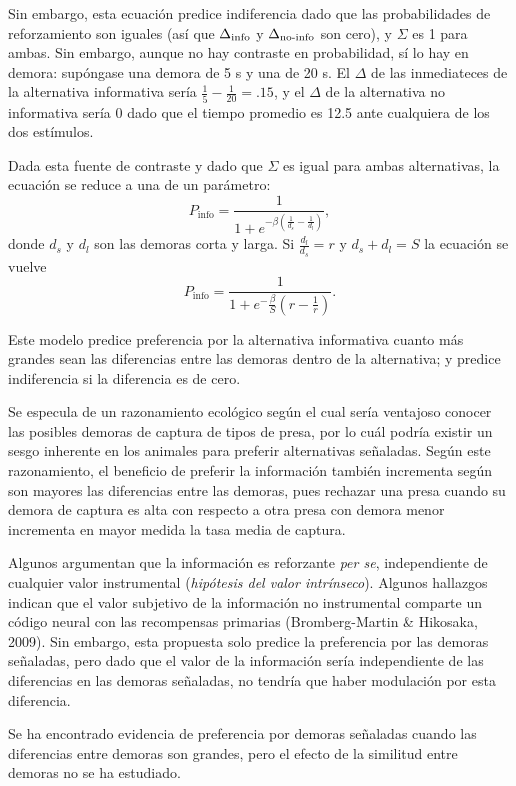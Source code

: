 \documentclass[a4paper,12pt]{article}
\begin{document}
Sin embargo, esta ecuación predice indiferencia dado que las probabilidades de reforzamiento son iguales (así que $\Delta_{\mbox{\scriptsize info}}$ y $\Delta_{\mbox{\scriptsize no-info}}$ son cero), y $\Sigma$ es 1 para ambas.
Sin embargo, aunque no hay contraste en probabilidad, sí lo hay en demora: supóngase una demora de 5 s y una de 20 s.
El $\Delta$ de las inmediateces de la alternativa informativa sería $\frac{1}{5} - \frac{1}{20} = .15$, y el $\Delta$ de la alternativa no informativa sería 0 dado que el tiempo promedio es 12.5 ante cualquiera de los dos estímulos.

Dada esta fuente de contraste y dado que $\Sigma$ es igual para ambas alternativas, la ecuación se reduce a una de un parámetro:
\[
P_{\mbox{info}} = \frac{
    1
}{
    1 + e^{-\beta\left(\frac{1}{d_s} - \frac{1}{d_l}\right)}
}
,\]
donde $d_s$ y $d_l$ son las demoras corta y larga.
Si $\frac{d_l}{d_s} = r$ y $d_s + d_l = S$ la ecuación se vuelve
\[
P_{\mbox{info}} = \frac{
    1
}{
    1 + e^-{\frac{\beta}{S} \left(r - \frac{1}{r}\right)}
}
.\]

Este modelo predice preferencia por la alternativa informativa cuanto más grandes sean las diferencias entre las demoras dentro de la alternativa; y predice indiferencia si la diferencia es de cero.

Se especula de un razonamiento ecológico según el cual sería ventajoso conocer las posibles demoras de captura de tipos de presa, por lo cuál podría existir un sesgo inherente en los animales para preferir alternativas señaladas.
Según este razonamiento, el beneficio de preferir la información también incrementa según son mayores las diferencias entre las demoras, pues rechazar una presa cuando su demora de captura es alta con respecto a otra presa con demora menor incrementa en mayor medida la tasa media de captura.

Algunos argumentan que la información es reforzante {\itshape per se}, independiente de cualquier valor instrumental ({\slshape hipótesis del valor intrínseco}).
Algunos hallazgos indican que el valor subjetivo de la información no instrumental comparte un código neural con las recompensas primarias (Bromberg-Martin \& Hikosaka, 2009).
Sin embargo, esta propuesta solo predice la preferencia por las demoras señaladas, pero dado que el valor de la información sería independiente de las diferencias en las demoras señaladas, no tendría que haber modulación por esta diferencia.

Se ha encontrado evidencia de preferencia por demoras señaladas cuando las diferencias entre demoras son grandes, pero el efecto de la similitud entre demoras no se ha estudiado.
\end{document}
